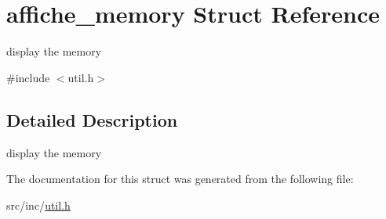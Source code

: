 \hypertarget{structaffiche__memory}{}\section{affiche\+\_\+memory Struct Reference}
\label{structaffiche__memory}


display the memory  




{\ttfamily \#include $<$util.\+h$>$}



\subsection{Detailed Description}
display the memory 

The documentation for this struct was generated from the following file\+:\begin{DoxyCompactItemize}
\item 
src/inc/\mbox{\hyperlink{util_8h}{util.\+h}}\end{DoxyCompactItemize}
